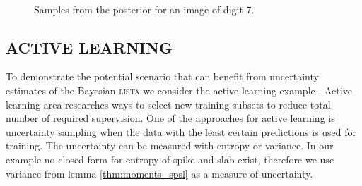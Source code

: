 \documentclass[letterpaper]{article}
\begin{document}
\begin{figure}[t]
\centering
{}~
~
\caption{Samples from the posterior for an image of digit 7.}
\label{fig:posterior_samples}
\end{figure}

\subsection{\uppercase{Active learning}}
To demonstrate the potential scenario that can benefit from uncertainty estimates of the Bayesian \textsc{lista} we consider the active learning example \citep{settles.tr09}. Active learning area researches ways to select new training subsets to reduce total number of required supervision. One of the approaches for active learning is uncertainty sampling when the data with the least certain predictions is used for training. The uncertainty can be measured with entropy or variance. In our example no closed form for entropy of spike and slab exist, therefore we use variance from lemma \ref{thm:moments_spsl} as a measure of uncertainty.
\end{document}
